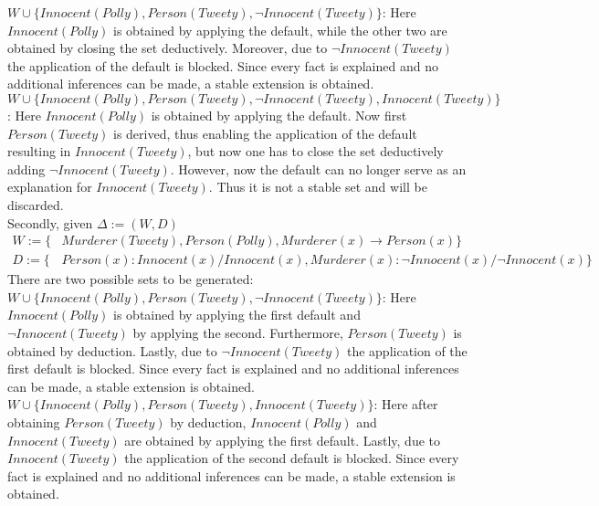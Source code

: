 \documentclass{extarticle}
\begin{document}
$W \cup \{Innocent(Polly), Person(Tweety), \neg Innocent(Tweety)\}$: Here $Innocent(Polly)$ is obtained by applying the default, while the other two are obtained by closing the set deductively. Moreover, due to  $\neg Innocent(Tweety)$ the application of the default is blocked. Since every fact is explained and no additional inferences can be made, a stable extension is obtained.\\

$W \cup \{Innocent(Polly), Person(Tweety), \neg Innocent(Tweety), Innocent(Tweety)\}$: Here \linebreak $Innocent(Polly)$ is obtained by applying the default. Now first $Person(Tweety)$ is derived, thus enabling the application of the default resulting in  $ Innocent(Tweety)$, but now one has to close the set deductively adding $\neg  Innocent(Tweety)$. However, now the default can no longer serve as an explanation for $ Innocent(Tweety)$. Thus it is not a stable set and will be discarded.\\

Secondly, given $\Delta:=(W,D)$
\begin{equation*}
\begin{split}
 W:= \{&Murderer(Tweety), Person(Polly),  Murderer(x) \to  Person(x) \}\\
 D:=\{&Person(x):Innocent(x)/Innocent(x),  Murderer(x): \neg Innocent(x)/\neg Innocent(x)\}
\end{split}
\end{equation*}
There are two possible sets to be generated: \\

$W \cup \{Innocent(Polly), Person(Tweety), \neg Innocent(Tweety)\}$: Here $Innocent(Polly)$ is obtained by applying the first default and $\neg Innocent(Tweety)$ by applying the second. Furthermore, $Person(Tweety)$ is obtained by deduction. Lastly, due to  $\neg Innocent(Tweety)$ the application of the first default is blocked. Since every fact is explained and no additional inferences can be made, a stable extension is obtained. \\

$W \cup \{Innocent(Polly), Person(Tweety), Innocent(Tweety)\}$: Here after obtaining \linebreak 
$Person(Tweety)$ by deduction, $Innocent(Polly)$ and $Innocent(Tweety)$ are obtained by applying the first default. Lastly, due to $Innocent(Tweety)$ the application of the  second default is blocked. Since every fact is explained and no additional inferences can be made, a stable extension is obtained. \\
\end{document}
